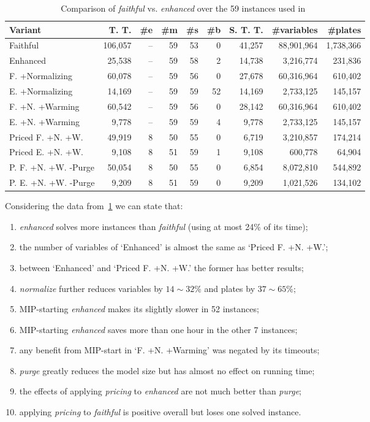 \documentclass[ppgc,prop-tese,english,formais,babel]{iiufrgs}
\begin{document}
\begin{table}
\centering
{}
\caption{Comparison of \emph{faithful} vs. \emph{enhanced} over the 59 instances used in~\citet{dimitri_thesis}}
\begin{tabular}{lrrrrrrrr}
\hline\hline
Variant & T. T. & \#e & \#m & \#s & \#b & S. T. T. & \#variables & \#plates \\\hline
Faithful & 106,057 & -- & 59 & 53 & 0 & 41,257 & 88,901,964 & 1,738,366 \\
Enhanced & 25,538 & -- & 59 & 58 & 2 & 14,738 & 3,216,774 & 231,836 \\
F. +Normalizing & 60,078 & -- & 59 & 56 & 0 & 27,678 & 60,316,964 & 610,402 \\
E. +Normalizing & 14,169 & -- & 59 & 59 & 52 & 14,169 & 2,733,125 & 145,157 \\
F. +N. +Warming & 60,542 & -- & 59 & 56 & 0 & 28,142 & 60,316,964 & 610,402 \\
E. +N. +Warming & 9,778 & -- & 59 & 59 & 4 & 9,778 & 2,733,125 & 145,157 \\
Priced F. +N. +W. & 49,919 & 8 & 50 & 55 & 0 & 6,719 & 3,210,857 & 174,214 \\
Priced E. +N. +W. & 9,108 & 8 & 51 & 59 & 1 & 9,108 & 600,778 & 64,904 \\
P. F. +N. +W. -Purge & 50,054 & 8 & 50 & 55 & 0 & 6,854 & 8,072,810 & 544,892 \\
P. E. +N. +W. -Purge & 9,209 & 8 & 51 & 59 & 0 & 9,209 & 1,021,526 & 134,102 \\\hline\hline
\end{tabular}
\label{tab:contribution}
\end{table}

Considering the data from~\cref{tab:contribution} we can state that:
\begin{enumerate}
\item \emph{enhanced} solves more instances than \emph{faithful} (using at most 24\% of its time);
\item the number of variables of `Enhanced' is almost the same as `Priced F. +N. +W.';
\item between `Enhanced' and `Priced F. +N. +W.' the former has better results;
\item \emph{normalize} further reduces variables by \(14\sim32\)\% and plates by \(37\sim65\)\%;
\item MIP-starting \emph{enhanced} makes its slightly slower in 52 instances;
\item MIP-starting \emph{enhanced} saves more than one hour in the other 7 instances;
\item any benefit from MIP-start in `F. +N. +Warming' was negated by its timeouts;
\item \emph{purge} greatly reduces the model size but has almost no effect on running time;
\item the effects of applying \emph{pricing} to \emph{enhanced} are not much better than \emph{purge};
\item applying \emph{pricing} to \emph{faithful} is positive overall but loses one solved instance.
\end{enumerate}
\end{document}

